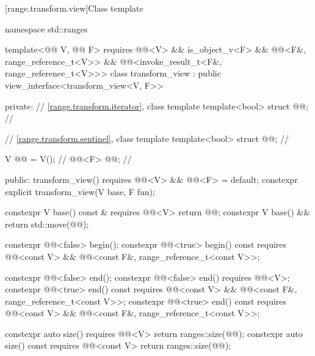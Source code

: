 [range.transform.view]{Class template }

%
%
%
\begin{codeblock}
namespace std::ranges {
  template<@@ V, @@ F>
    requires @@<V> && is_object_v<F> &&
             @@<F&, range_reference_t<V>> &&
             @@<invoke_result_t<F&, range_reference_t<V>>>
  class transform_view : public view_interface<transform_view<V, F>> {
  private:
    // \ref{range.transform.iterator}, class template 
    template<bool> struct @@;             // \expos

    // \ref{range.transform.sentinel}, class template 
    template<bool> struct @@;             // \expos

    V @@ = V();                              // \expos
    @@<F> @@;                        // \expos

  public:
    transform_view() requires @@<V> && @@<F> = default;
    constexpr explicit transform_view(V base, F fun);

    constexpr V base() const & requires @@<V> { return @@; }
    constexpr V base() && { return std::move(@@); }

    constexpr @@<false> begin();
    constexpr @@<true> begin() const
      requires @@<const V> &&
               @@<const F&, range_reference_t<const V>>;

    constexpr @@<false> end();
    constexpr @@<false> end() requires @@<V>;
    constexpr @@<true> end() const
      requires @@<const V> &&
               @@<const F&, range_reference_t<const V>>;
    constexpr @@<true> end() const
      requires @@<const V> &&
               @@<const F&, range_reference_t<const V>>;

    constexpr auto size() requires @@<V> { return ranges::size(@@); }
    constexpr auto size() const requires @@<const V>
    { return ranges::size(@@); }

}}
\end{codeblock}
